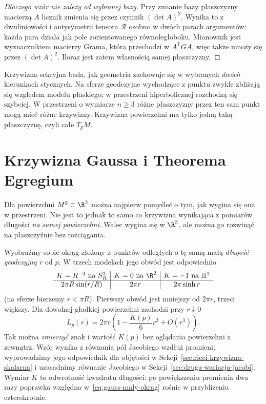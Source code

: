 \begin{proof}[Dlaczego wzór nie zależy od wybranej bazy]
Przy zmianie bazy płaszczyzny macierzą $A$ licznik
zmienia się przez czynnik $(\det A)^2$.
Wynika to z dwuliniowości i antysymetrii tensora
$\mathcal R$ osobno w dwóch parach argumentów:
każda para działa jak pole zorientowanego
równoległoboku. Mianownik jest wyznacznikiem
macierzy Grama, która przechodzi w $A^{\mathsf T}GA$,
więc także mnoży się przez $(\det A)^2$.
Iloraz jest zatem własnością samej płaszczyzny.
\end{proof}

\begin{uwaga}[intuicja]\label{uwaga:intuicja-sekcyjna}
Krzywizna sekcyjna bada, jak geometria zachowuje się
w wybranych \emph{dwóch} kierunkach stycznych. Na
sferze geodezyjne wychodzące z punktu zwykle zbliżają
się względem modelu płaskiego; w przestrzeni
hiperbolicznej rozchodzą się szybciej. W przestrzeni
o wymiarze $n\geq3$ różne płaszczyzny przez ten sam
punkt mogą mieć różne krzywizny. Krzywizna powierzchni
ma tylko jedną taką płaszczyznę, czyli całe $T_pM$.
\end{uwaga}

\section{Krzywizna Gaussa i \texorpdfstring{Theorema Egregium}{Theorema Egregium}}

Dla powierzchni $M^2\subset\R^3$ można najpierw pomyśleć
o tym, jak wygina się ona w przestrzeni. Nie jest to jednak
to samo co krzywizna wynikająca z pomiarów długości
\emph{na samej powierzchni}. Walec wygina się w $\R^3$,
ale można go rozwinąć na płaszczyźnie bez rozciągania.

Wyobraźmy sobie okrąg złożony z punktów odległych
o tę samą małą \emph{długość geodezyjną} $r$ od $p$.
W trzech modelach jego obwód jest odpowiednio
\[
 \begin{array}{c|c|c}
 K=R^{-2}\text{ na }S_R^2 & K=0\text{ na }\R^2
                         & K=-1\text{ na }\mathbb H^2\\ \hline
 2\pi R\sin(r/R) & 2\pi r & 2\pi\sinh r
 \end{array}
\]
(na sferze bierzemy $r<\pi R$). Pierwszy obwód jest
mniejszy od $2\pi r$, trzeci większy. Dla dowolnej
gładkiej powierzchni zachodzi przy $r\downarrow0$
\begin{equation}\label{eq:gauss-maly-okrag}
 L_p(r)=2\pi r\left(1-\frac{K(p)}6r^2+O(r^3)\right).
\end{equation}
Tak można \emph{zmierzyć} znak i wartość $K(p)$ bez
oglądania powierzchni z zewnątrz. Wzór wynika z
równania pól Jacobiego wzdłuż promieni; wyprowadzimy
jego odpowiednik dla objętości w
Sekcji~\ref{sec:ricci-krzywizna-skalarna} i uzasadnimy równanie
Jacobiego w Sekcji~\ref{sec:druga-wariacja-jacobi}.
Wymiar $K$ to odwrotność kwadratu długości: po
powiększeniu promienia dwa razy poprawka względna
w~\eqref{eq:gauss-maly-okrag} rośnie w przybliżeniu
czterokrotnie.

